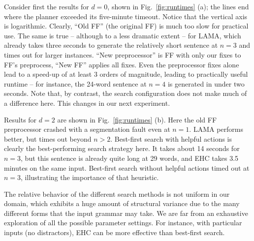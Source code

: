 

Consider first the results for $d=0$, shown in Fig.~\ref{fig:runtimes}
(a); the lines end where the planner exceeded its five-minute
timeout. Notice that the vertical axis is logarithmic. Clearly, ``Old
FF'' (the original FF) is much too slow for practical use. The same is
true -- although to a less dramatic extent -- for LAMA, which already
takes three seconds to generate the relatively short sentence at $n=3$
and times out for larger instances. ``New preprocessor'' is FF with
only our fixes to FF's preprocess, ``New FF'' applies all fixes.
Even the preprocessor fixes alone lead to a speed-up of at least $3$
orders of magnitude, leading to practically useful runtime -- for
instance, the 24-word sentence at $n=4$ is generated in under two
seconds. Note that, by contrast, the search configuration does not
make much of a difference here. This changes in our next experiment.

Results for $d=2$ are shown in Fig.~\ref{fig:runtimes} (b).  Here the
old FF preprocessor crashed with a segmentation fault even at
$n=1$. LAMA performs better, but times out beyond $n>2$.  Best-first
search with helpful actions is clearly the best-performing search
strategy here.  It takes about 14 seconds for $n=3$, but this sentence
is already quite long at 29 words, and EHC takes 3.5 minutes on the
same input.  Best-first search without helpful actions timed out at
$n=3$, illustrating the importance of that heuristic.

The relative behavior of the different search methods is not uniform
in our domain, which exhibits a huge amount of structural variance due
to the many different forms that the input grammar may take. We are
far from an exhaustive exploration of all the possible parameter
settings. For instance, with particular inputs (no distractors), EHC
can be more effective than best-first search.


